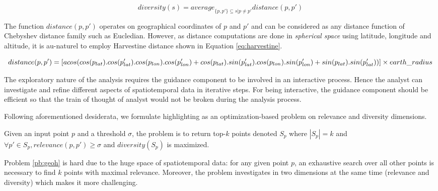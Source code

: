 \begin{dmath}
\label{eq:divs}
\mathit{diversity}(s) = \mathit{average}_{\{p, p'\} \subseteq s | p \neq p' } \mathit{distance}(p,p')
\end{dmath} 

The function $\mathit{distance}(p,p')$ operates on geographical coordinates of $p$ and $p'$ and can be considered as any distance function of Chebyshev distance family such as Eucledian. However, as distance computations are done in {\em spherical space} using latitude, longitude and altitude, it is au-naturel to employ Harvestine distance shown in Equation \ref{eq:harvestine}.

\begin{dmath}
\label{eq:harvestine}
distance(p,p') = [ acos(cos(p_{lat}) . cos(p'_{lat}) . cos(p_{lon}) . cos(p'_{lon})\\ + cos(p_{lat}) . sin(p'_{lat}). cos(p_{lon}) . sin(p'_{lon}) + sin(p_{lat}) . sin(p'_{lat})) ] \times earth\_radius
\end{dmath}

 The exploratory nature of the analysis requires the guidance component to be involved in an interactive process. Hence the analyst can investigate and refine different aspects of spatiotemporal data in iterative steps. For being interactive, the guidance component should be efficient so that the train of thought of analyst would not be broken during the analysis process.

\vspace{5pt}
Following aforementioned desiderata, we formulate highlighting as an optimization-based problem on relevance and diversity dimensions.

\begin{problem}[\pb]
\label{pb:geoh}
Given an input point $p$ and a threshold $\sigma$, the problem is to return top-$k$
 points denoted $S_p$ where $|S_p| = k$ and $\forall p' \in S_p, \mathit{relevance}(p,p') \geq \sigma$ and $\mathit{diversity}(S_p)$ is maximized.
\end{problem}

Problem \ref{pb:geoh} is hard due to the huge space of spatiotemporal data: for any given point $p$, an exhaustive search over all other points is necessary to find $k$ points with maximal relevance. Moreover, the problem investigates in two dimensions at the same time (relevance and diversity) which makes it more challenging.

